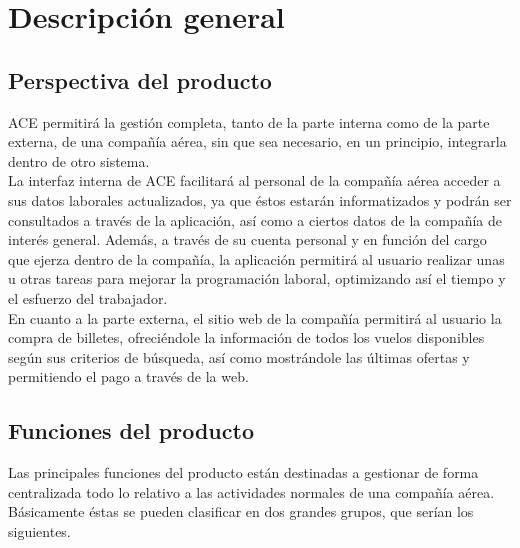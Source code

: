 \documentclass[11pt, a4paper, twoside]{report}
\begin{document}
	\section{Descripción general}
		\subsection{Perspectiva del producto}
			ACE permitirá la gestión completa, tanto de la parte interna como de la parte externa, de una compañía aérea, sin que sea necesario, en un principio, integrarla dentro de otro sistema. \\
			
			La interfaz interna de ACE facilitará al personal de la compañía aérea acceder a sus datos laborales actualizados, ya que éstos estarán informatizados y podrán ser consultados a través de la aplicación, así como a ciertos datos de la compañía de interés general. Además, a través de su cuenta personal y en función del cargo que ejerza dentro de la compañía, la aplicación permitirá al usuario realizar unas u otras tareas para mejorar la programación laboral, optimizando así el tiempo y el esfuerzo del trabajador. \\
			
			En cuanto a la parte externa, el sitio web de la compañía permitirá al usuario la compra de billetes, ofreciéndole la información de todos los vuelos disponibles según sus criterios de búsqueda, así como mostrándole las últimas ofertas y permitiendo el pago a través de la web.
			
		\subsection{Funciones del producto}
			Las principales funciones del producto están destinadas a gestionar de forma centralizada todo lo relativo a las actividades normales de una compañía aérea. Básicamente éstas se pueden clasificar en dos grandes grupos, que serían los siguientes. \\
			
\end{document}
